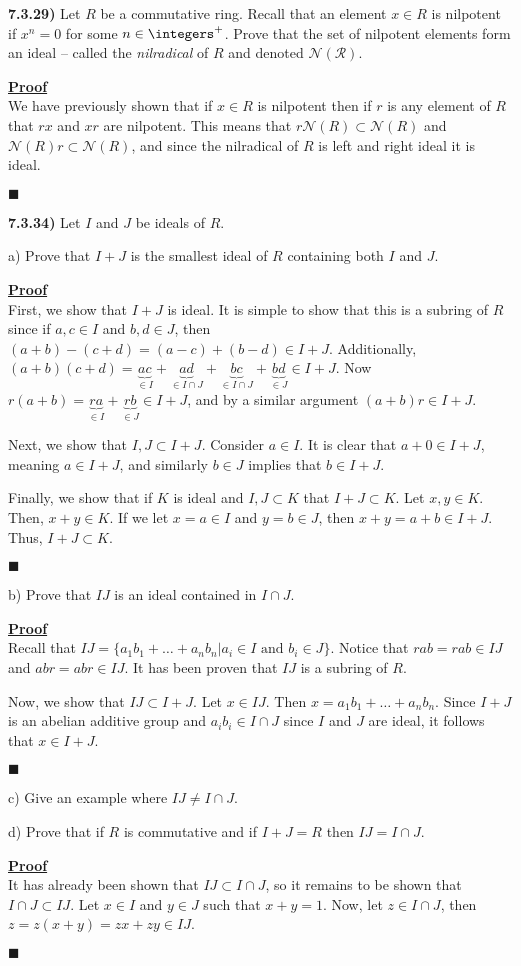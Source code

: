 \documentclass[12pt,a4paper]{article}
\newcommand{\prob}[2]{\textbf{#1)} #2}
\newenvironment{proof}
{
\textbf{\underline{Proof}} \\
}
{
\begin{flushright}
$\blacksquare$
\end{flushright}}
\begin{document}
\prob{7.3.29}{
Let $R$ be a commutative ring. Recall that an element $x \in R$ is nilpotent if $x^{n} = 0$ for some $n \in \integers^{+}$. Prove that the set of nilpotent elements form an ideal -- called the \textit{nilradical} of $R$ and denoted $\mathcal{N(R)}$.
}

\begin{proof}
	We have previously shown that if $x \in R$ is nilpotent then if $r$ is any element of $R$ that $rx$ and $xr$ are nilpotent.
	This means that $r\mathcal{N}(R) \subset \mathcal{N}(R)$ and $\mathcal{N}(R)r \subset \mathcal{N}(R)$, and since the nilradical of $R$ is left and right ideal it is ideal.
\end{proof}

\prob{7.3.34}{Let $I$ and $J$ be ideals of $R$.}

a) Prove that $I+J$ is the smallest ideal of $R$ containing both $I$ and $J$.

\begin{proof}
	First, we show that $I + J$ is ideal.
	It is simple to show that this is a subring of $R$ since if $a,c \in I$ and $b,d \in J$, then $(a+b) - (c+d) = (a-c) + (b-d) \in I + J$.
	Additionally, $(a+b)(c+d) = \underbrace{ac}_{\in I} + \underbrace{ad}_{\in I \cap J} + \underbrace{bc}_{\in I \cap J} + \underbrace{bd}_{\in J} \in I + J$.
	Now $r(a + b) = \underbrace{ra}_{\in I} + \underbrace{rb}_{\in J} \in I + J$, and by a similar argument $(a+b)r \in I + J$.
	
	Next, we show that $I,J \subset I + J$.
	Consider $a \in I$. It is clear that $a + 0 \in I + J$, meaning $a \in I + J$, and similarly $b \in J$ implies that $b \in I + J$.
	
	Finally, we show that if $K$ is ideal and $I,J \subset K$ that $I + J \subset K$. 
	Let $x,y \in K$.
	Then, $x + y \in K$.
	If we let $x = a \in I$ and $y = b \in J$, then $x + y = a + b \in I + J$.
	Thus, $I + J \subset K$.
\end{proof}

b) Prove that $IJ$ is an ideal contained in $I \cap J$.

\begin{proof}
	Recall that $IJ = \{ a_1b_1 + \ldots + a_nb_n | a_i \in I \text{ and } b_i \in J \}$.
	Notice that $rab = rab \in IJ$ and $abr = abr \in IJ$.
	It has been proven that $IJ$ is a subring of $R$.
	
	Now, we show that $IJ \subset I + J$.
	Let $x \in IJ$.
	Then $x = a_1b_1 + \ldots + a_nb_n$.
	Since $I + J$ is an abelian additive group and $a_ib_i \in I \cap J$ since $I$ and $J$ are ideal, it follows that $x \in I + J$.
\end{proof}

c) Give an example where $IJ \ne I \cap J$.

d) Prove that if $R$ is commutative and if $I + J = R$ then $IJ = I \cap J$.

\begin{proof}
	It has already been shown that $IJ \subset I \cap J$, so it remains to be shown that $I \cap J \subset IJ$.
	Let $x \in I$ and $y \in J$ such that $x + y = 1$.
	Now, let $z \in I \cap J$, then $z = z(x + y) = zx + zy \in IJ$.
\end{proof}
\end{document}
